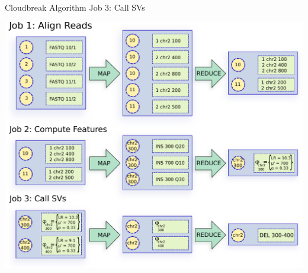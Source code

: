 \documentclass{beamer}
\begin{document}
\begin{frame}{Cloudbreak Algorithm Job 3: Call SVs}
  \begin{center}   
    \includegraphics[width=\textwidth,height=0.8\textheight,keepaspectratio]{cloudbreak_mapred_diagram_build_3.pdf}
  \end{center}
\end{frame}

\end{document}
